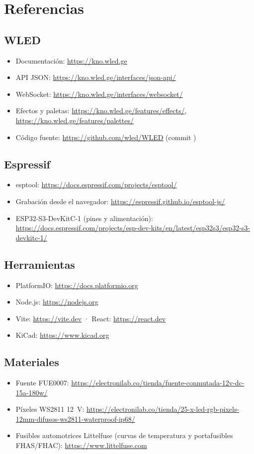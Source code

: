 \chapter{Referencias}\label{anx:referencias}

\section{WLED}
\begin{itemize}
\item Documentación: \url{https://kno.wled.ge}
\item API JSON: \url{https://kno.wled.ge/interfaces/json-api/}
\item WebSocket: \url{https://kno.wled.ge/interfaces/websocket/}
\item Efectos y paletas: \url{https://kno.wled.ge/features/effects/}, \url{https://kno.wled.ge/features/palettes/}
\item Código fuente: \url{https://github.com/wled/WLED} (commit \texttt{})
\end{itemize}

\section{Espressif}
\begin{itemize}
\item esptool: \url{https://docs.espressif.com/projects/esptool/}
\item Grabación desde el navegador: \url{https://espressif.github.io/esptool-js/}
\item ESP32-S3-DevKitC-1 (pines y alimentación): \url{https://docs.espressif.com/projects/esp-dev-kits/en/latest/esp32s3/esp32-s3-devkitc-1/}
\end{itemize}

\section{Herramientas}
\begin{itemize}
\item PlatformIO: \url{https://docs.platformio.org}
\item Node.js: \url{https://nodejs.org}
\item Vite: \url{https://vite.dev} · React: \url{https://react.dev}
\item KiCad: \url{https://www.kicad.org}
\end{itemize}

\section{Materiales}
\begin{itemize}
\item Fuente FUE0007: \url{https://electronilab.co/tienda/fuente-conmutada-12v-dc-15a-180w/}
\item Píxeles WS2811 12~V: \url{https://electronilab.co/tienda/25-x-led-rgb-pixels-12mm-difusos-ws2811-waterproof-ip68/}
\item Fusibles automotrices Littelfuse (curvas de temperatura y portafusibles FHAS/FHAC): \url{https://www.littelfuse.com}
\end{itemize}

